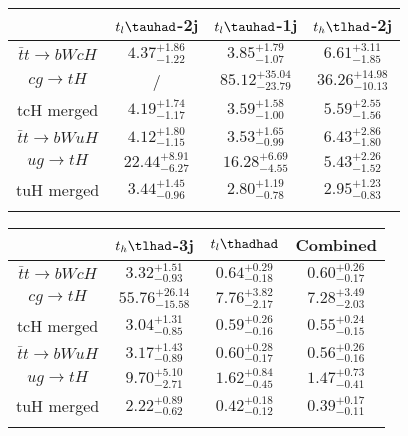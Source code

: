 \centering
\begin{tabular}{cccc} \toprule\toprule
 & $t_l\tauhad$-2j & $t_l\tauhad$-1j & $t_h\tlhad$-2j\\\midrule
$\bar{t}t\to bWcH$ & $4.37^{+1.86}_{-1.22}$ & $3.85^{+1.79}_{-1.07}$ & $6.61^{+3.11}_{-1.85}$\\
$cg\to tH$ &  / & $85.12^{+35.04}_{-23.79}$ & $36.26^{+14.98}_{-10.13}$\\
tcH merged & $4.19^{+1.74}_{-1.17}$ & $3.59^{+1.58}_{-1.00}$ & $5.59^{+2.55}_{-1.56}$\\
$\bar{t}t\to bWuH$ & $4.12^{+1.80}_{-1.15}$ & $3.53^{+1.65}_{-0.99}$ & $6.43^{+2.86}_{-1.80}$\\
$ug\to tH$ & $22.44^{+8.91}_{-6.27}$ & $16.28^{+6.69}_{-4.55}$ & $5.43^{+2.26}_{-1.52}$\\
tuH merged & $3.44^{+1.45}_{-0.96}$ & $2.80^{+1.19}_{-0.78}$ & $2.95^{+1.23}_{-0.83}$\\
\bottomrule\bottomrule\\
\end{tabular}
\begin{tabular}{cccc} \toprule\toprule
 & $t_h\tlhad$-3j & $t_l\thadhad$ & Combined\\\midrule
$\bar{t}t\to bWcH$ & $3.32^{+1.51}_{-0.93}$ & $0.64^{+0.29}_{-0.18}$ & $0.60^{+0.26}_{-0.17}$\\
$cg\to tH$ & $55.76^{+26.14}_{-15.58}$ & $7.76^{+3.82}_{-2.17}$ & $7.28^{+3.49}_{-2.03}$\\
tcH merged & $3.04^{+1.31}_{-0.85}$ & $0.59^{+0.26}_{-0.16}$ & $0.55^{+0.24}_{-0.15}$\\
$\bar{t}t\to bWuH$ & $3.17^{+1.43}_{-0.89}$ & $0.60^{+0.28}_{-0.17}$ & $0.56^{+0.26}_{-0.16}$\\
$ug\to tH$ & $9.70^{+5.10}_{-2.71}$ & $1.62^{+0.84}_{-0.45}$ & $1.47^{+0.73}_{-0.41}$\\
tuH merged & $2.22^{+0.89}_{-0.62}$ & $0.42^{+0.18}_{-0.12}$ & $0.39^{+0.17}_{-0.11}$\\
\bottomrule\bottomrule\\
\end{tabular}
